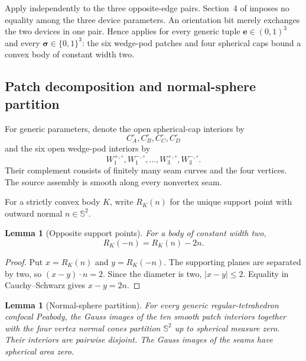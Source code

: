 \documentclass[11pt]{article}
\numberwithin{equation}{section}
\newtheorem{lemma}[theorem]{Lemma}
\theoremstyle{remark}
\newcommand{\Sph}{\mathbb{S}^{2}}
\begin{document}
Apply  independently to the three opposite-edge pairs.  Section~4 of \cite{ArelioMontejanoOliveros2023} imposes no equality among the three device parameters.  An orientation bit merely exchanges the two devices in one pair.  Hence \cite[Theorem~4.5]{ArelioMontejanoOliveros2023} applies for every generic tuple \(\mathbf e\in(0,1)^3\) and every \(\boldsymbol\sigma\in\{0,1\}^3\): the six wedge-pod patches and four spherical caps bound a convex body of constant width two.

\subsection{Patch decomposition and normal-sphere partition}

For generic parameters, denote the open spherical-cap interiors by
\[
  C_A^\circ,C_B^\circ,C_C^\circ,C_D^\circ
\]
and the six open wedge-pod interiors by
\[
  W_1^{+,\circ},W_1^{-,\circ},\ldots,W_3^{+,\circ},W_3^{-,\circ}.
\]
Their complement consists of finitely many seam curves and the four vertices.  The source assembly is smooth along every nonvertex seam.

For a strictly convex body \(K\), write \(R_K(n)\) for the unique support point with outward normal \(n\in\Sph\).

\begin{lemma}[Opposite support points]
\label{lem:opposite}
For a body of constant width two,
\begin{equation}
  R_K(-n)=R_K(n)-2n.
  \label{eq:opposite-support}
\end{equation}
\end{lemma}

\begin{proof}
Put \(x=R_K(n)\) and \(y=R_K(-n)\).  The supporting planes are separated by two, so \((x-y)\cdot n=2\).  Since the diameter is two, \(|x-y|\le2\).  Equality in Cauchy--Schwarz gives \(x-y=2n\).
\end{proof}

\begin{lemma}[Normal-sphere partition]
\label{lem:normal-partition}
For every generic regular-tetrahedron confocal Peabody, the Gauss images of the ten smooth patch interiors together with the four vertex normal cones partition \(\Sph\) up to spherical measure zero.  Their interiors are pairwise disjoint.  The Gauss images of the seams have spherical area zero.
\end{lemma}
\end{document}
